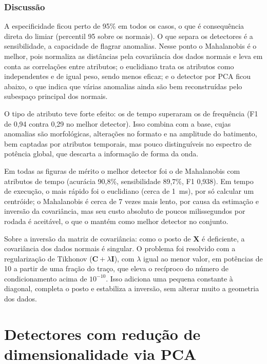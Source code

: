 \documentclass[12pt,a4paper]{scrartcl}
\begin{document}
\subsubsection{Discussão}

A especificidade ficou perto de 95\% em todos os casos, o que é consequência direta do limiar (percentil 95 sobre os normais). O que separa os detectores é a sensibilidade, a capacidade de flagrar anomalias. Nesse ponto o Mahalanobis é o melhor, pois normaliza as distâncias pela covariância dos dados normais e leva em conta as correlações entre atributos; o euclidiano trata os atributos como independentes e de igual peso, sendo menos eficaz; e o detector por PCA ficou abaixo, o que indica que várias anomalias ainda são bem reconstruídas pelo subespaço principal dos normais.

O tipo de atributo teve forte efeito: os de tempo superaram os de frequência (F1 de 0,94 contra 0,29 no melhor detector). Isso combina com a base, cujas anomalias são morfológicas, alterações no formato e na amplitude do batimento, bem captadas por atributos temporais, mas pouco distinguíveis no espectro de potência global, que descarta a informação de forma da onda.

Em todas as figuras de mérito o melhor detector foi o de Mahalanobis com atributos de tempo (acurácia 90,8\%, sensibilidade 89,7\%, F1 0,938). Em tempo de execução, o mais rápido foi o euclidiano (cerca de 1~ms), por só calcular um centróide; o Mahalanobis é cerca de 7 vezes mais lento, por causa da estimação e inversão da covariância, mas seu custo absoluto de poucos milissegundos por rodada é aceitável, o que o mantém como melhor detector no conjunto.

Sobre a inversão da matriz de covariância: como o posto de $\mathbf{X}$ é deficiente, a covariância dos dados normais é singular. O problema foi resolvido com a regularização de Tikhonov ($\mathbf{C} + \lambda\mathbf{I}$), com $\lambda$ igual ao menor valor, em potências de 10 a partir de uma fração do traço, que eleva o recíproco do número de condicionamento acima de $10^{-10}$. Isso adiciona uma pequena constante à diagonal, completa o posto e estabiliza a inversão, sem alterar muito a geometria dos dados.

\section{Detectores com redução de dimensionalidade via PCA}
\label{sec:pca}
\end{document}
